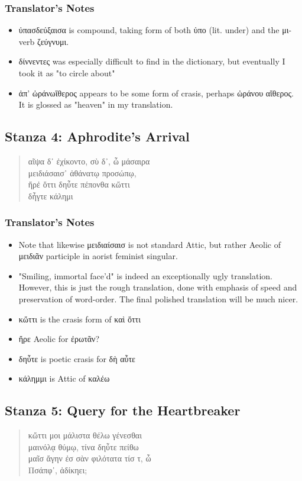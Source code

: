 \subsubsection*{Translator's Notes}
\begin{itemize}
  \item ὐπασδεύξαισα is compound, taking form of both ὑπο (lit. under) and the μι-verb ζεύγνυμι.
  \item δίννεντες was especially difficult to find in the dictionary, but eventually I took it as "to circle about"
  \item ἀπ' ὠράνωἴθερος appears to be some form of crasis, perhaps ὠράνου αἴθερος. It is glossed as "heaven" in my translation.
\end{itemize}

\subsection*{Stanza 4: Aphrodite's Arrival}
\begin{quote}
  αῖψα δ᾽ ἐχίκοντο, σὺ δ᾽, ὦ μάσαιρα\\
  μειδιάσαισ᾽ ἀθάνατῳ προσώπῳ,\\
  ἤρἐ ὄττι δηὖτε πέπονθα κὤττι\\
  δἦγτε κάλημι
\end{quote}

\subsubsection*{Translator's Notes}
\begin{itemize}
  \item Note that likewise μειδιαίσαισ is not standard Attic, but rather Aeolic of μειδιᾶν participle in aorist feminist singular.
  \item "Smiling, immortal face'd" is indeed an exceptionally ugly translation. However, this is just the rough translation, done with emphasis of speed and preservation of word-order. The final polished translation will be much nicer.
  \item κὤττι is the crasis form of καὶ ὄττι
  \item ἤρε Aeolic for ἐρωτᾶν?
  \item δηὖτε is poetic crasis for δὴ αὖτε
  \item κάλημμι is Attic of καλέω
\end{itemize}

\subsection*{Stanza 5: Query for the Heartbreaker}
\begin{quote}
  κὤττι μοι μάλιστα θέλω γένεσθαι\\
  μαινόλᾳ θύμῳ, τίνα δηὖτε πείθω\\
  μαῖσ ἄγην ἐσ σὰν φιλότατα τίσ τ, ὦ\\
  Πσάπφ᾽, ἀδίκηει;
\end{quote}

